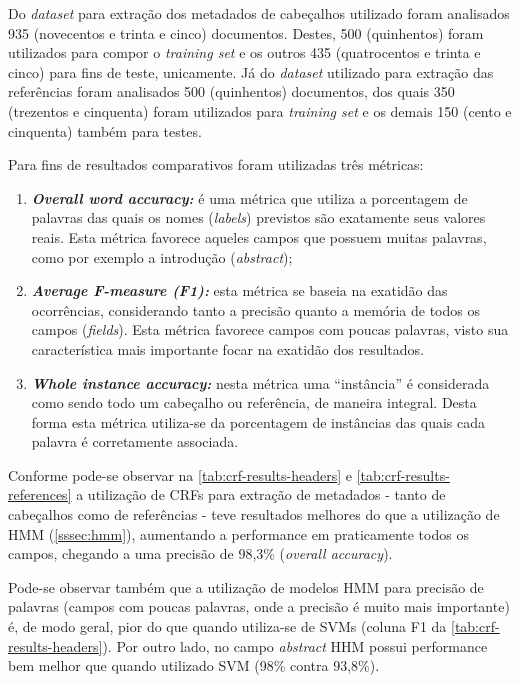 Do \emph{dataset} para extração dos metadados de cabeçalhos utilizado foram analisados 935 (novecentos e trinta e cinco) documentos. Destes, 500 (quinhentos) foram utilizados para compor o \emph{training set} e os outros 435 (quatrocentos e trinta e cinco) para fins de teste, unicamente. Já do \emph{dataset} utilizado para extração das referências foram analisados 500 (quinhentos) documentos, dos quais 350 (trezentos e cinquenta) foram utilizados para \emph{training set} e os demais 150 (cento e cinquenta) também para testes.

Para fins de resultados comparativos foram utilizadas três métricas:

\begin{enumerate}
    \item \emph{\textbf{Overall word accuracy:}} é uma métrica que utiliza a porcentagem de palavras das quais os nomes (\emph{labels}) previstos são exatamente seus valores reais. Esta métrica favorece aqueles campos que possuem muitas palavras, como por exemplo a introdução (\emph{abstract});
    \item \emph{\textbf{Average F-measure (F1):}} esta métrica se baseia na exatidão das ocorrências, considerando tanto a precisão quanto a memória de todos os campos (\emph{fields}). Esta métrica favorece campos com poucas palavras, visto sua característica mais importante focar na exatidão dos resultados.
    \item \emph{\textbf{Whole instance accuracy:}} nesta métrica uma ``instância'' é considerada como sendo todo um cabeçalho ou referência, de maneira integral. Desta forma esta métrica utiliza-se da porcentagem de instâncias das quais cada palavra é corretamente associada.
\end{enumerate}

Conforme pode-se observar na \autoref{tab:crf-results-headers} e \autoref{tab:crf-results-references} a utilização de CRFs para extração de metadados - tanto de cabeçalhos como de referências - teve resultados melhores do que a utilização de HMM (\autoref{sssec:hmm}), aumentando a performance em praticamente todos os campos, chegando a uma precisão de 98,3\% (\emph{overall accuracy}).

Pode-se observar também que a utilização de modelos HMM para precisão de palavras (campos com poucas palavras, onde a precisão é muito mais importante) é, de modo geral, pior do que quando utiliza-se de SVMs (coluna F1 da \autoref{tab:crf-results-headers}). Por outro lado, no campo \emph{abstract} HHM possui performance bem melhor que quando utilizado SVM (98\% contra 93,8\%).

